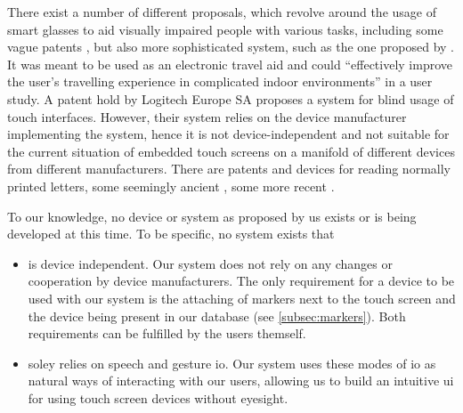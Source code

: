 There exist a number of different proposals, which revolve around the usage of smart glasses to aid visually impaired people with various tasks, including some vague patents \autocite{smartglasses, smartglasses2, smartglasses3}, but also more sophisticated system, such as the one proposed by \textcite{bai2017smart}.
It was meant to be used as an electronic travel aid and could \enquote{effectively improve the user's travelling experience in complicated indoor environments} in a user study.
A patent hold by Logitech Europe SA \autocite{logitech} proposes a system for blind usage of touch interfaces.
However, their system relies on the device manufacturer implementing the system, hence it is not device-independent and not suitable for the current situation of embedded touch screens on a manifold of different devices from different manufacturers.
There are patents and devices for reading normally printed letters, some seemingly ancient \cite{ring}, some more recent \cite{ring2}.

To our knowledge, no device or system as proposed by us exists or is being developed at this time.
To be specific, no system exists that 
\begin{itemize}
	\item
		is device independent.
		Our system does not rely on any changes or cooperation by device manufacturers.
		The only requirement for a device to be used with our system is the attaching of markers next to the touch screen and the device being present in our database (see \autoref{subsec:markers}).
		Both requirements can be fulfilled by the users themself.
	\item
		soley relies on speech and gesture \ac{io}.
		Our system uses these modes of \ac{io} as natural ways of interacting with our users, allowing us to build an intuitive \ac{ui} for using touch screen devices without eyesight.
\end{itemize}




